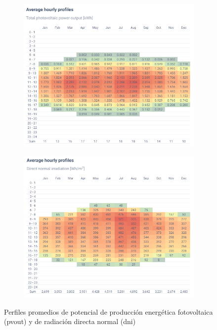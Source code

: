 \begin{figure}[H]
    \centering    
    \begin{subfigure}{0.75\linewidth}
        \centering
        \includegraphics[width=\linewidth]{img/diseno/averagepvouthour.png}
        \label{fig:averagepvouthour}
    \end{subfigure}\hfill

    \begin{subfigure}{0.75\linewidth}
        \centering
        \includegraphics[width=\linewidth]{img/diseno/averagednihour.png}
        \label{fig:averagepdnihour}
    \end{subfigure}    
    \caption{Perfiles promedios de potencial de producción energética fotovoltaica (\acrshort{pvout}) y de radiación directa normal (\acrshort{dni}) \cite{globalsolar}}
    \label{fig:averagehour}
\end{figure}

